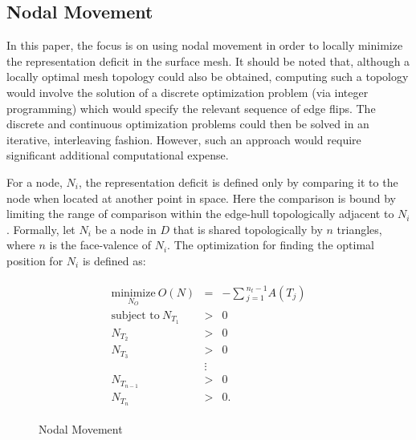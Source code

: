 \subsection{Nodal Movement}
In this paper, the focus is on using nodal movement in 
order to locally minimize the representation deficit in the surface mesh.  
It should be noted that, although a locally optimal mesh topology could 
also be obtained, computing such a topology would involve the solution of 
a discrete optimization problem (via integer programming) which would 
specify the relevant sequence of edge flips.  The discrete 
and continuous optimization problems could then be solved in an iterative, 
interleaving fashion.  However, such an approach would require significant 
additional computational expense.

For a node, $N_i$, the representation deficit is defined only by
comparing it to the node when located at another point in space. Here
the comparison is bound by limiting the range of comparison within the
edge-hull topologically adjacent to $N_i$. Formally, let $N_i$ be a node
in $D$ that is shared topologically by $n$ triangles, where $n$ is the
face-valence of $N_i$. The optimization for finding the optimal position
for $N_i$ is defined as:

\begin{eqnarray*}
\begin{array}{rcl}
\underset{N_O}{\text{minimize}} \ O(N) & = &
-\sum{_{j=1}^{n_t-1}A\left(T_j\right)} \\
\text{subject to} \ N_{T_1} & > & 0 \\
N_{T_2} & > & 0 \\ 
N_{T_3} & > & 0 \\
& \vdots & \\
N_{T_{n-1}} & > & 0 \\ 
N_{T_n} & > & 0.
\end{array}
\end{eqnarray*}

\begin{figure}[h!]
  \caption{Nodal Movement}
\end{figure}

